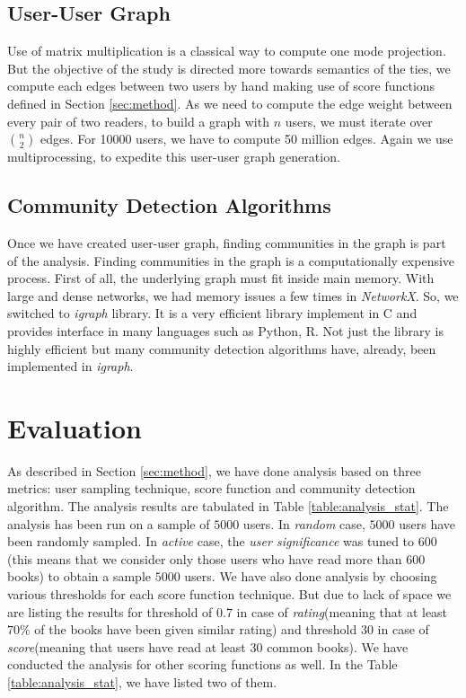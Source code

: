 \documentclass[11pt]{article}
\begin{document}
\subsection{User-User Graph}
Use of matrix multiplication is a classical way to compute one mode projection. But the objective of the study is directed more towards semantics of the ties, we compute each edges between two users by hand making use of score functions defined in Section \ref{sec:method}. As we need to compute the edge weight between every pair of two readers, to build a graph with $n$ users, we must iterate over $n \choose 2$ edges. For 10000 users, we have to compute 50 million edges. Again we use multiprocessing, to expedite this user-user graph generation.

\subsection{Community Detection Algorithms}
Once we have created user-user graph, finding communities in the graph is part of the analysis. Finding communities in the graph is a computationally expensive process. First of all, the underlying graph must fit inside main memory. With large and dense networks, we had memory issues a few times in {\it NetworkX}. So, we switched to {\it igraph} library\cite{igraph}. It is a very efficient library implement in C and provides interface in many languages such as Python, R. Not just the library is highly efficient but many community detection algorithms have, already, been implemented in {\it igraph}.


\section{Evaluation}

As described in Section \ref{sec:method}, we have done analysis based on three metrics: user sampling technique, score function and community detection algorithm. The analysis results are tabulated in Table \ref{table:analysis_stat}. The analysis has been run on a sample of $5000$ users. In {\it random} case, $5000$ users have been randomly sampled. In {\it active} case, the {\it user significance} was tuned to $600$(this means that we consider only those users who have read more than $600$ books) to obtain a sample $5000$ users. We have also done analysis by choosing various thresholds for each score function technique. But due to lack of space we are listing the results for threshold of 0.7 in case of {\it rating}(meaning that at least $70\%$ of the books have been given similar rating) and threshold 30 in case of {\it score}(meaning that users have read at least 30 common books). We have conducted the analysis for other scoring functions as well. In the Table \ref{table:analysis_stat}, we have listed two of them.
\end{document}
